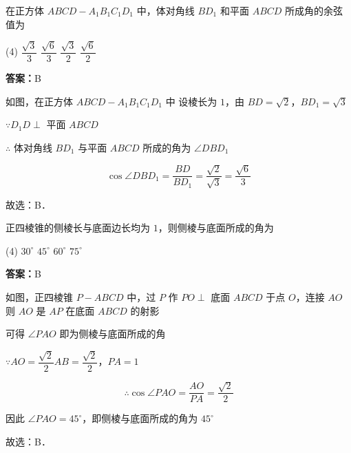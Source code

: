 \vspace{2em}


\begin{example}[\bkstar{2}{5}]
在正方体 $ABCD-A_1B_1C_1D_1$ 中，体对角线 $BD_1$ 和平面 $ABCD$ 所成角的余弦值为
\begin{tasks}(4)
    \task $\dfrac{\sqrt{3}}{3}$
    \task $\dfrac{\sqrt{6}}{3}$
    \task $\dfrac{\sqrt{3}}{2}$
    \task $\dfrac{\sqrt{6}}{2}$
\end{tasks}
\end{example}
\begin{solution}
\textbf{答案：}B

如图，在正方体 $ABCD-A_1B_1C_1D_1$ 中
设棱长为 $1$，由 $BD=\sqrt{2}$，$BD_1=\sqrt{3}$

$\because D_1D\perp$ 平面 $ABCD$

$\therefore$ 体对角线 $BD_1$ 与平面 $ABCD$ 所成的角为 $\angle DBD_1$

$$
\cos\angle DBD_1=\dfrac{BD}{BD_1}=\dfrac{\sqrt{2}}{\sqrt{3}}=\dfrac{\sqrt{6}}{3}
$$

故选：B．
\end{solution}

\vspace{2em}

\begin{example}[\bkstar{2}{5}]
正四棱锥的侧棱长与底面边长均为 $1$，则侧棱与底面所成的角为
\begin{tasks}(4)
    \task $30^{\circ}$
    \task $45^{\circ}$
    \task $60^{\circ}$
    \task $75^{\circ}$
\end{tasks}
\end{example}
\begin{solution}
\textbf{答案：}B

如图，正四棱锥 $P-ABCD$ 中，过 $P$ 作 $PO\perp$ 底面 $ABCD$ 于点 $O$，连接 $AO$
则 $AO$ 是 $AP$ 在底面 $ABCD$ 的射影

可得 $\angle PAO$ 即为侧棱与底面所成的角

$\because AO=\dfrac{\sqrt{2}}{2}AB=\dfrac{\sqrt{2}}{2}$，$PA=1$

$$
\therefore \cos\angle PAO=\dfrac{AO}{PA}=\dfrac{\sqrt{2}}{2}
$$

因此 $\angle PAO=45^{\circ}$，即侧棱与底面所成的角为 $45^{\circ}$

故选：B．
\end{solution}

